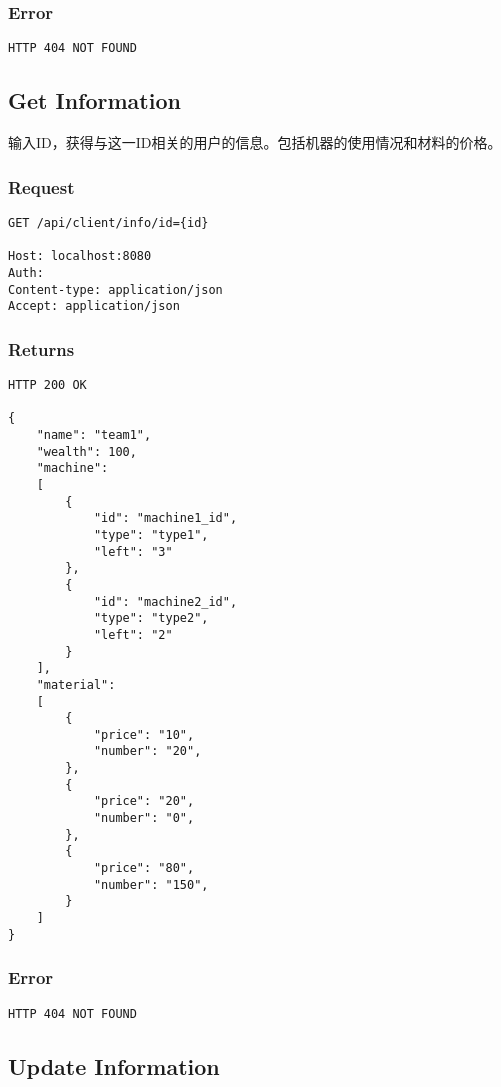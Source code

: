 \documentclass{article}
\begin{document}
\subsubsection*{Error}
\begin{lstlisting}
HTTP 404 NOT FOUND
\end{lstlisting}

\subsection{Get Information}

输入ID，获得与这一ID相关的用户的信息。包括机器的使用情况和材料的价格。

\subsubsection*{Request}
\begin{lstlisting}
GET /api/client/info/id={id}

Host: localhost:8080
Auth:
Content-type: application/json
Accept: application/json
\end{lstlisting}

\subsubsection*{Returns}
\begin{lstlisting}
HTTP 200 OK

{
    "name": "team1",
    "wealth": 100,
    "machine": 
    [
        {
            "id": "machine1_id", 
            "type": "type1",
            "left": "3"
        },
        {
            "id": "machine2_id",
            "type": "type2",
            "left": "2"
        }
    ],
    "material": 
    [
        {
            "price": "10",
            "number": "20",
        },
        {
            "price": "20",
            "number": "0",
        },
        {
            "price": "80",
            "number": "150",
        }
    ]
}
\end{lstlisting}

\subsubsection*{Error}
\begin{lstlisting}
HTTP 404 NOT FOUND
\end{lstlisting}

\subsection{Update Information}
\end{document}

